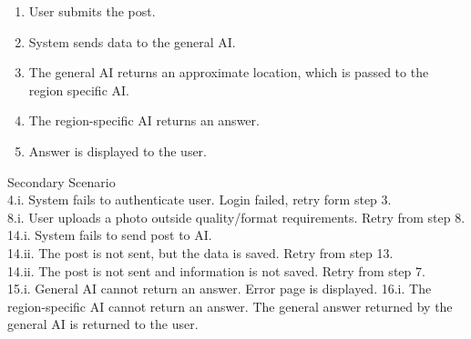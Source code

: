 \documentclass[]{article}
\begin{document}
\begin{enumerate}[{\bf BE1.}]
\begin{enumerate}[{\bf VP1.}]
\begin{enumerate}[{1.}]
                        \item User submits the post.
                        \item System sends data to the general AI.
                        \item The general AI returns an approximate location, which is passed to the region specific AI.
                        \item The region-specific AI returns an answer. 
                        \item Answer is displayed to the user. \\
                    \end{enumerate}
                    Secondary Scenario \\
                    4.i. System fails to authenticate user. Login failed, retry form step 3. \\
                    8.i. User uploads a photo outside quality/format requirements. Retry from step 8.\\ 
                    14.i. System fails to send post to AI. \\
                    14.ii. The post is not sent, but the data is saved. Retry from step 13. \\
                    14.ii. The post is not sent and information is not saved. Retry from step 7. \\
                    15.i. General AI cannot return an answer. Error page is displayed. 
                    16.i. The region-specific AI cannot return an answer. The general answer returned by the general AI is returned to the user.
                    

\end{enumerate}
\end{enumerate}
\end{document}
